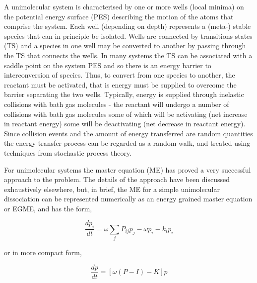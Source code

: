 A unimolecular system is characterised by one or more wells (local minima) on the potential energy surface (PES) describing the motion of the atoms that comprise the system. Each well (depending on depth) represents a (meta-) stable species that can in principle be isolated. Wells are connected by transitions states (TS) and a species in one well may be converted to another by passing through the TS that connects the wells. In many systems the TS can be associated with a saddle point on the system PES and so there is an energy barrier to interconversion of species. Thus, to convert from one species to another, the reactant must be activated, that is energy must be supplied to overcome the barrier separating the two wells. Typically, energy is supplied through inelastic collisions with bath gas molecules - the reactant will undergo a number of collisions with bath gas molecules some of which will be activating (net increase in reactant energy) some will be deactivating (net decrease in reactant energy).  Since collision events and the amount of energy transferred are random quantities the energy transfer process can be regarded as a random walk, and treated using techniques from stochastic process theory.

For unimolecular systems the master equation (ME) has proved a very successful approach to the problem. The details of the approach have been discussed exhaustively elsewhere, but, in brief, the ME for a simple unimolecular dissociation can be represented numerically as an energy grained master equation or EGME, and has the form,


\begin{equation}
\frac{{dp_i }}{{dt}} = \omega \sum\limits_j {P_{ij} p_j }  - \omega p_i  - k_i p_i 
\end{equation}

or in more compact form,

\begin{equation}
\frac{{dp}}{{dt}} = \left[ {\omega (P - I) - K} \right]p
\end{equation}

